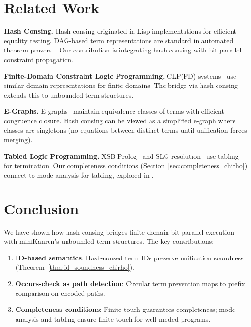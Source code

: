 \documentclass[11pt,a4paper]{article}
\begin{document}
\section{Related Work}
\label{sec:related_chirho}

\textbf{Hash Consing.}
Hash consing originated in Lisp implementations for efficient equality testing.
DAG-based term representations are standard in automated theorem provers~\cite{harrison_handbook_chirho}.
Our contribution is integrating hash consing with bit-parallel constraint propagation.

\textbf{Finite-Domain Constraint Logic Programming.}
CLP(FD) systems~\cite{clpfd_chirho} use similar domain representations for finite domains.
The bridge via hash consing extends this to unbounded term structures.

\textbf{E-Graphs.}
E-graphs~\cite{egg_chirho} maintain equivalence classes of terms with efficient congruence closure.
Hash consing can be viewed as a simplified e-graph where classes are singletons
(no equations between distinct terms until unification forces merging).

\textbf{Tabled Logic Programming.}
XSB Prolog~\cite{xsb_chirho} and SLG resolution~\cite{slg_chirho} use tabling for termination.
Our completeness conditions (Section~\ref{sec:completeness_chirho}) connect to
mode analysis for tabling, explored in \paperD.

\section{Conclusion}
\label{sec:conclusion_chirho}

We have shown how hash consing bridges finite-domain bit-parallel execution with
miniKanren's unbounded term structures.
The key contributions:

\begin{enumerate}
  \item \textbf{ID-based semantics}: Hash-consed term IDs preserve unification
        soundness (Theorem~\ref{thm:id_soundness_chirho}).

  \item \textbf{Occurs-check as path detection}: Circular term prevention maps
        to prefix comparison on encoded paths.

  \item \textbf{Completeness conditions}: Finite touch guarantees completeness;
        mode analysis and tabling ensure finite touch for well-moded programs.
\end{enumerate}
\end{document}
